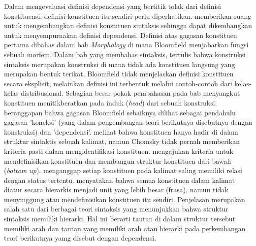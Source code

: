 Dalam mengevaluasi definisi dependensi yang bertitik tolak dari definisi konstituensi, definisi konstituen itu sendiri perlu diperhatikan. \cite{bloomfield1933language} memberikan ruang untuk mengembangkan definisi konstituen sintaksis sehingga dapat dikembangkan untuk menyempurnakan definisi dependensi. Definisi \cite{bloomfield1933language} atas gagasan konstituen pertama dibahas dalam bab \textit{Morphology} di mana Bloomfield menjabarkan fungsi sebuah morfem. Dalam bab yang membahas sintaksis, tertulis bahwa konstruksi sintaksis merupakan konstruksi di mana tidak ada konstituen langsung yang merupakan bentuk terikat. Bloomfield tidak menjelaskan definisi konstituen secara eksplisit, melainkan definisi ini terbentuk melalui contoh-contoh dari kelas-kelas distribusional. Sebagian besar pokok pembahasan pada bab menyangkut konstituen menitikberatkan pada induk (\textit{head}) dari sebuah konstruksi. \cite{gerdes2013defining} beranggapan bahwa gagasan Bloomfield sebaiknya dilihat sebagai pendahulu gagasan 'koneksi' (yang dalam pengembangan teori berikutnya disebutnya dengan konstruksi) dan 'dependensi'. \cite{chomsky1986barriers} melihat bahwa konstituen hanya hadir di dalam struktur sintaktis sebuah kalimat, namun Chomsky tidak pernah memberikan kriteria pasti dalam mengidentifikasi konstituen. \cite{gleason1961introduction} mengajukan kriteria untuk mendefinisikan konstituen dan membangun struktur konstituen dari bawah (\textit{bottom up}). \cite{gleason1961introduction} menganggap setiap konstituen pada kalimat saling memiliki relasi dengan status tertentu. \cite{haegeman1994introduction} menyatakan bahwa semua konstituen dalam kalimat diatur secara hierarkis menjadi unit yang lebih besar (frasa), namun tidak menyinggung atau mendefinisikan konstituen itu sendiri. Penjelasan \cite{haegeman1994introduction} merupakan salah satu dari berbagai teori sintaksis yang menunjukkan bahwa struktur sintaksis memiliki hierarki. Hal ini berarti tautan di dalam struktur tersebut memiliki arah dan tautan yang memiliki arah atau hierarki pada perkembangan teori berikutnya yamg disebut dengan  dependensi. 

